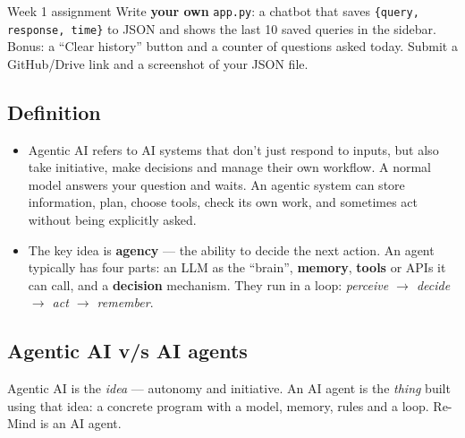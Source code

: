 \begin{task}{Week 1 assignment}
Write \textbf{your own} \texttt{app.py}: a chatbot that saves \texttt{\{query, response, time\}} to JSON and shows the
last 10 saved queries in the sidebar. Bonus: a ``Clear history'' button and a counter of questions asked today.
Submit a GitHub/Drive link and a screenshot of your JSON file.
\end{task}



\subsection{Definition}
\begin{itemize}
  \item Agentic AI refers to AI systems that don't just respond to inputs, but also take initiative, make decisions
        and manage their own workflow. A normal model answers your question and waits. An agentic system can store
        information, plan, choose tools, check its own work, and sometimes act without being explicitly asked.
  \item The key idea is \textbf{agency} --- the ability to decide the next action. An agent typically has four parts:
        an LLM as the ``brain'', \textbf{memory}, \textbf{tools} or APIs it can call, and a \textbf{decision}
        mechanism. They run in a loop: \emph{perceive $\rightarrow$ decide $\rightarrow$ act $\rightarrow$ remember}.
\end{itemize}

\subsection{Agentic AI v/s AI agents}
Agentic AI is the \emph{idea} --- autonomy and initiative. An AI agent is the \emph{thing} built using that idea:
a concrete program with a model, memory, rules and a loop. Re-Mind is an AI agent.

